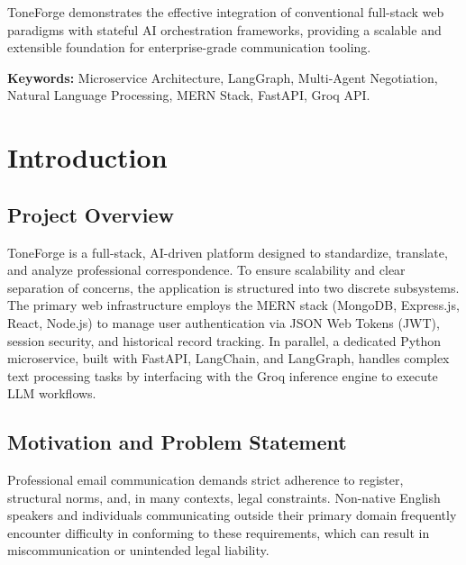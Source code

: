 \documentclass[12pt,a4paper]{report}
\begin{document}
ToneForge demonstrates the effective integration of conventional full-stack web paradigms with stateful AI orchestration frameworks, providing a scalable and extensible foundation for enterprise-grade communication tooling.

\vspace{1cm}
\noindent \textbf{Keywords:} Microservice Architecture, LangGraph, Multi-Agent Negotiation, Natural Language Processing, MERN Stack, FastAPI, Groq API.

\clearpage

\tableofcontents
\clearpage
\listoffigures
\clearpage
\listoftables
\clearpage


\chapter{Introduction}

\section{Project Overview}
ToneForge is a full-stack, AI-driven platform designed to standardize, translate, and analyze professional correspondence. To ensure scalability and clear separation of concerns, the application is structured into two discrete subsystems. The primary web infrastructure employs the MERN stack (MongoDB, Express.js, React, Node.js) to manage user authentication via JSON Web Tokens (JWT), session security, and historical record tracking. In parallel, a dedicated Python microservice, built with FastAPI, LangChain, and LangGraph, handles complex text processing tasks by interfacing with the Groq inference engine to execute LLM workflows.

\section{Motivation and Problem Statement}
Professional email communication demands strict adherence to register, structural norms, and, in many contexts, legal constraints. Non-native English speakers and individuals communicating outside their primary domain frequently encounter difficulty in conforming to these requirements, which can result in miscommunication or unintended legal liability.
\end{document}
